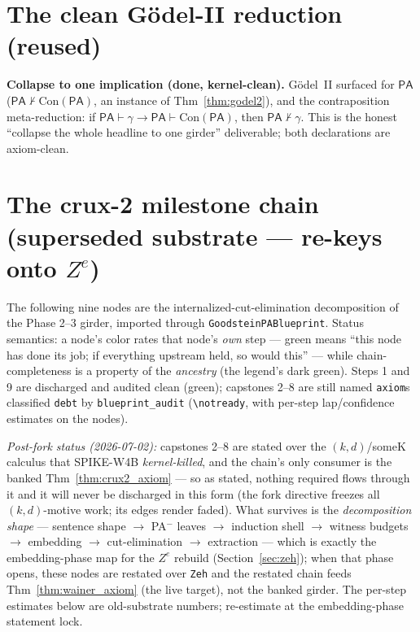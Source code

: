 \section{The clean Gödel-II reduction (reused)}

\begin{theorem}\label{thm:godel2_reduction}
  \leanok
\textbf{Collapse to one implication (done, kernel-clean).}  Gödel~II surfaced for \(\mathsf{PA}\)
(\(\mathsf{PA}\nvdash\mathrm{Con}(\mathsf{PA})\), an instance of Thm~\ref{thm:godel2}), and the
contraposition meta-reduction: if \(\mathsf{PA}\vdash\gamma\to\mathsf{PA}\vdash\mathrm{Con}(\mathsf{PA})\),
then \(\mathsf{PA}\nvdash\gamma\).  This is the honest ``collapse the whole headline to one girder''
deliverable; both declarations are axiom-clean.
\end{theorem}

\section{The crux-2 milestone chain (superseded substrate --- re-keys onto \(Z^{e}\))}

The following nine nodes are the internalized-cut-elimination decomposition of the Phase 2--3 girder,
imported through \texttt{GoodsteinPABlueprint}.  Status semantics: a node's color rates that node's
\emph{own} step --- green means ``this node has done its job; if everything upstream held, so would
this'' --- while chain-completeness is a property of the \emph{ancestry} (the legend's dark green).
Steps 1 and 9 are discharged and audited clean (green); capstones 2--8 are still named
\texttt{axiom}s classified \texttt{debt} by \texttt{blueprint\_audit}
(\texttt{\textbackslash notready}, with per-step lap/confidence estimates on the nodes).

\emph{Post-fork status (2026-07-02):} capstones 2--8 are stated over the \((k,d)\)/someK calculus
that SPIKE-W4B \emph{kernel-killed}, and the chain's only consumer is the banked
Thm~\ref{thm:crux2_axiom} --- so as stated, nothing required flows through it and it will never be
discharged in this form (the fork directive freezes all \((k,d)\)-motive work; its edges render
faded).  What survives is the \emph{decomposition shape} --- sentence shape \(\to\) PA\(^-\) leaves
\(\to\) induction shell \(\to\) witness budgets \(\to\) embedding \(\to\) cut-elimination \(\to\)
extraction --- which is exactly the embedding-phase map for the \(Z^{e}\) rebuild
(Section~\ref{sec:zeh}); when that phase opens, these nodes are restated over \texttt{Zeh} and the
restated chain feeds Thm~\ref{thm:wainer_axiom} (the live target), not the banked girder.  The
per-step estimates below are old-substrate numbers; re-estimate at the embedding-phase statement
lock.

